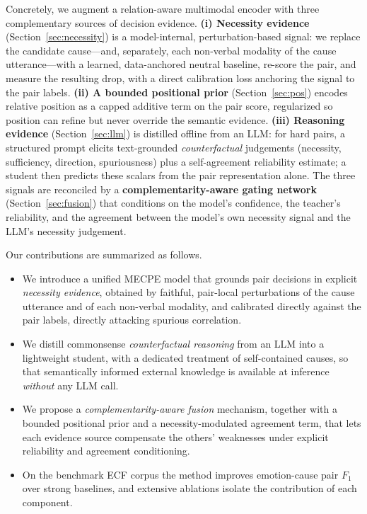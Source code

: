 \documentclass[journal]{IEEEtran}
\begin{document}
Concretely, we augment a relation-aware multimodal encoder with three complementary
sources of decision evidence. \textbf{(i) Necessity evidence}
(Section~\ref{sec:necessity}) is a model-internal, perturbation-based signal: we
replace the candidate cause---and, separately, each non-verbal modality of the cause
utterance---with a learned, data-anchored neutral baseline, re-score the pair, and
measure the resulting drop, with a direct calibration loss anchoring the signal to
the pair labels. \textbf{(ii) A bounded positional prior}
(Section~\ref{sec:pos}) encodes relative position as a capped additive term on the
pair score, regularized so position can refine but never override the semantic
evidence. \textbf{(iii) Reasoning evidence} (Section~\ref{sec:llm}) is distilled
offline from an LLM: for hard pairs, a structured prompt elicits text-grounded
\emph{counterfactual} judgements (necessity, sufficiency, direction, spuriousness)
plus a self-agreement reliability estimate; a student then predicts these scalars
from the pair representation alone. The three signals are reconciled by a
\textbf{complementarity-aware gating network} (Section~\ref{sec:fusion}) that
conditions on the model's confidence, the teacher's reliability, and the agreement
between the model's own necessity signal and the LLM's necessity judgement.

Our contributions are summarized as follows.
\begin{itemize}
  \item We introduce a unified MECPE model that grounds pair decisions in explicit
  \emph{necessity evidence}, obtained by faithful, pair-local perturbations of the
  cause utterance and of each non-verbal modality, and calibrated directly against
  the pair labels, directly attacking spurious correlation.
  \item We distill commonsense \emph{counterfactual reasoning} from an LLM into a
  lightweight student, with a dedicated treatment of self-contained causes, so that
  semantically informed external knowledge is available at inference \emph{without}
  any LLM call.
  \item We propose a \emph{complementarity-aware fusion} mechanism, together with a
  bounded positional prior and a necessity-modulated agreement term, that lets each
  evidence source compensate the others' weaknesses under explicit reliability and
  agreement conditioning.
  \item On the benchmark ECF corpus the method improves emotion-cause pair $F_1$ over
  strong baselines, and extensive ablations isolate the contribution of each
  component. %
\end{itemize}
\end{document}
